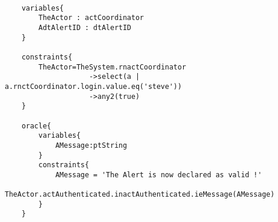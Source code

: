 	\scriptsize
	\vspace{0.5cm}
	\begin{lstlisting}[style=MessirStyle,firstnumber=auto,captionpos=b,caption={\msrmessir (MCL-oriented) specification of the test step \emph{testcase01-ts14oeValidateAlert}.},label=TM-testcase01-ts14oeValidateAlert-MCL-LST]

	variables{
		TheActor : actCoordinator
		AdtAlertID : dtAlertID
	}
	
	constraints{
		TheActor=TheSystem.rnactCoordinator
		            ->select(a | a.rnctCoordinator.login.value.eq('steve'))
		            ->any2(true)
	}
	
	oracle{
		variables{
			AMessage:ptString
		}
		constraints{
			AMessage = 'The Alert is now declared as valid !'
			TheActor.actAuthenticated.inactAuthenticated.ieMessage(AMessage)
		}
	}
	
	\end{lstlisting}
	\normalsize 
	
	
